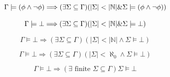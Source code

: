 \documentclass[12pt,letterpaper]{article}
\theoremstyle{definition}
\theoremstyle{remark}
\begin{document}
\begin{huge}
	\begin{equation*}
	\Gamma \models (\phi \land \neg \phi) \Longrightarrow (\exists \Sigma \subseteq \Gamma)(|\Sigma| < |\mathbb{N}| \textnormal{\&} \Sigma \models (\phi \land \neg \phi))
	\end{equation*}
\end{huge}

\begin{huge}
	\begin{equation*}
	\Gamma \models \bot \Longrightarrow (\exists \Sigma \subseteq \Gamma)(|\Sigma| < |\mathbb{N}| \textnormal{\&} \Sigma \models \bot)
	\end{equation*}
\end{huge}

\begin{huge}
	\begin{equation*}
	\Gamma \models \bot \Longrightarrow (\exists \Sigma \subseteq \Gamma)(|\Sigma| < |\mathbb{N}| \land \Sigma \models \bot)
	\end{equation*}
\end{huge}

\begin{huge}
	\begin{equation*}
	\Gamma \models \bot \Longrightarrow (\exists \Sigma \subseteq \Gamma)(|\Sigma| < \aleph_0 \land \Sigma \models \bot)
	\end{equation*}
\end{huge}

\begin{huge}
	\begin{equation*}
	\Gamma \models \bot \Longrightarrow (\exists \text{ finite } \Sigma \subseteq \Gamma)\Sigma \models \bot
	\end{equation*}
\end{huge}
\end{document}
